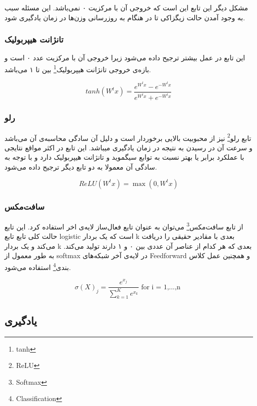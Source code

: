 \documentclass[12pt, a4paper, oneside]{report}
\begin{document}
مشکل دیگر این تابع این است که خروجی آن با مرکزیت ۰ نمی‌باشد. این مسئله سبب به وجود آمدن حالت زیگزاکی
تا در هنگام به روزرسانی وزن‌ها در زمان یادگیری شود.

\subsubsection{تانژانت هیپربولیک}

این تابع در عمل بیشتر ترجیح داده می‌شود زیرا خروجی آن با مرکزیت عدد ۰ است و بازه‌ی خروجی
تانژانت هیپربولیک\footnote{tanh}
بین
تا ۱ می‌باشد.

\begin{equation}
    tanh(W^tx) = \dfrac{e^{W^tx} -e^{-W^tx}}{e^{W^tx} + e^{-W^tx}}
\label{formula:tanh}
\end{equation}

\subsubsection{رلو}

تابع
رلو\footnote{ReLU}
نیز از محبوبیت بالایی برخوردار است و دلیل آن سادگی محاسبه‌ی آن می‌باشد و سرعت آن در رسیدن به نتیجه در زمان
یادگیری میباشد. این تابع در اکثر مواقع نتایجی با عملکرد برابر یا بهتر نسبت به توابع
سیگموید و تانژانت هیپربولیک
دارد و با توجه به سادگی آن معمولا به دو تابع دیگر ترجیح داده می‌شود.

\begin{equation}
    ReLU(W^tx) = \max(0, W^tx)
\label{formula:relu}
\end{equation}

\subsubsection{سافت‌مکس}

از تابع
سافت‌مکس\footnote{Softmax}
می‌توان به عنوان
تایع فعال‌ساز
لایه‌ی اخر استفاده کرد. این تابع حالت کلی تابع تابع
logistic
است که یک بردار
k
بعدی با مقادیر حقیقی را دریافت می‌کند و یک بردار
k
بعدی که هر کدام از عناصر آن عددی بین ۰ و ۱ دارند تولید می‌کند. به طور معمول از
softmax
در لایه‌ی آخر شبکه‌های
Feedforward
و همچنین عمل
کلاس بندی\footnote{Classification}
استفاده می‌شود.

\begin{equation}
   \sigma(X)_j = \dfrac{e^{x_j}}{\sum_{k = 1}^{K} e^{x_k} }  \mbox{ for i = 1,...,n }
\label{formula:softmax}
\end{equation}

\subsection{یادگیری}
\end{document}

